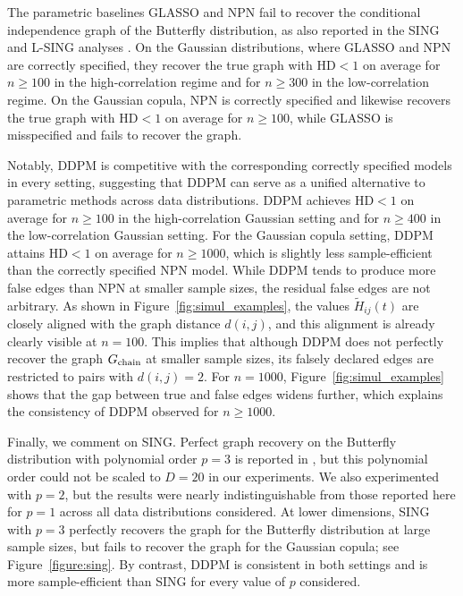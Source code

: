 \documentclass[11pt,a4paper,final]{article}
\numberwithin{equation}{section}
\theoremstyle{remark}
\begin{document}
The parametric baselines GLASSO and NPN fail to recover the conditional independence graph of the Butterfly distribution, as also reported in the SING and L-SING analyses \citep{baptista2024learning, liaw2025learning}.
On the Gaussian distributions, where GLASSO and NPN are correctly specified, they recover the true graph with $\mathrm{HD} < 1$ on average for $n \geq 100$ in the high-correlation regime and for $n \geq 300$ in the low-correlation regime.
On the Gaussian copula, NPN is correctly specified and likewise recovers the true graph with $\mathrm{HD} < 1$ on average for $n \geq 100$, while GLASSO is misspecified and fails to recover the graph.

Notably, DDPM is competitive with the corresponding correctly specified models in every setting, suggesting that DDPM can serve as a unified alternative to parametric methods across data distributions.
DDPM achieves $\mathrm{HD} < 1$ on average for $n \geq 100$ in the high-correlation Gaussian setting and for $n \geq 400$ in the low-correlation Gaussian setting.
For the Gaussian copula setting, DDPM attains $\mathrm{HD} < 1$ on average for $n \geq 1000$, which is slightly less sample-efficient than the correctly specified NPN model.
While DDPM tends to produce more false edges than NPN at smaller sample sizes, the residual false edges are not arbitrary.
As shown in Figure~\ref{fig:simul_examples}, the values $\widetilde H_{ij}(t)$ are closely aligned with the graph distance $d(i,j)$, and this alignment is already clearly visible at $n = 100$.
This implies that although DDPM does not perfectly recover the graph $G_{\rm chain}$ at smaller sample sizes, its falsely declared edges are restricted to pairs with $d(i,j) = 2$.
For $n = 1000$, Figure~\ref{fig:simul_examples} shows that the gap between true and false edges widens further, which explains the consistency of DDPM observed for $n \geq 1000$.

Finally, we comment on SING.
Perfect graph recovery on the Butterfly distribution with polynomial order $p = 3$ is reported in \cite{baptista2024learning}, but this polynomial order could not be scaled to $D = 20$ in our experiments.
We also experimented with $p = 2$, but the results were nearly indistinguishable from those reported here for $p = 1$ across all data distributions considered.
At lower dimensions, SING with $p = 3$ perfectly recovers the graph for the Butterfly distribution at large sample sizes, but fails to recover the graph for the Gaussian copula; see Figure~\ref{figure:sing}.
By contrast, DDPM is consistent in both settings and is more sample-efficient than SING for every value of $p$ considered.
\end{document}
